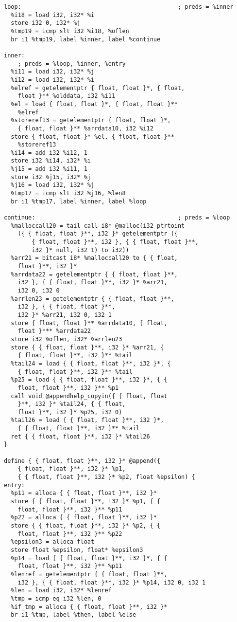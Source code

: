 \documentclass[main.tex]{subfiles}
\begin{document}
{\begin{lstlisting}
loop:                                             ; preds = %inner
  %i18 = load i32, i32* %i
  store i32 0, i32* %j
  %tmp19 = icmp slt i32 %i18, %oflen
  br i1 %tmp19, label %inner, label %continue

inner:                                            
    ; preds = %loop, %inner, %entry
  %i11 = load i32, i32* %j
  %i12 = load i32, i32* %i
  %elref = getelementptr { float, float }*, { float, 
    float }** %olddata, i32 %i11
  %el = load { float, float }*, { float, float }** 
    %elref
  %storeref13 = getelementptr { float, float }*, 
    { float, float }** %arrdata10, i32 %i12
  store { float, float }* %el, { float, float }** 
    %storeref13
  %i14 = add i32 %i12, 1
  store i32 %i14, i32* %i
  %j15 = add i32 %i11, 1
  store i32 %j15, i32* %j
  %j16 = load i32, i32* %j
  %tmp17 = icmp slt i32 %j16, %len8
  br i1 %tmp17, label %inner, label %loop

continue:                                         ; preds = %loop
  %malloccall20 = tail call i8* @malloc(i32 ptrtoint 
    ({ { float, float }**, i32 }* getelementptr ({ 
        { float, float }**, i32 }, { { float, float }**,
        i32 }* null, i32 1) to i32))
  %arr21 = bitcast i8* %malloccall20 to { { float, 
    float }**, i32 }*
  %arrdata22 = getelementptr { { float, float }**, 
    i32 }, { { float, float }**, i32 }* %arr21, 
    i32 0, i32 0
  %arrlen23 = getelementptr { { float, float }**, 
    i32 }, { { float, float }**, 
    i32 }* %arr21, i32 0, i32 1
  store { float, float }** %arrdata10, { float, 
    float }*** %arrdata22
  store i32 %oflen, i32* %arrlen23
  store { { float, float }**, i32 }* %arr21, { 
    { float, float }**, i32 }** %tail
  %tail24 = load { { float, float }**, i32 }*, {
    { float, float }**, i32 }** %tail
  %p25 = load { { float, float }**, i32 }*, { { 
    float, float }**, i32 }** %p1
  call void @appendhelp_copyin({ { float, float 
    }**, i32 }* %tail24, { { float, 
    float }**, i32 }* %p25, i32 0)
  %tail26 = load { { float, float }**, i32 }*, 
    { { float, float }**, i32 }** %tail
  ret { { float, float }**, i32 }* %tail26
}

define { { float, float }**, i32 }* @append({ 
    { float, float }**, i32 }* %p1, 
    { { float, float }**, i32 }* %p2, float %epsilon) {
entry:
  %p11 = alloca { { float, float }**, i32 }*
  store { { float, float }**, i32 }* %p1, { { 
    float, float }**, i32 }** %p11
  %p22 = alloca { { float, float }**, i32 }*
  store { { float, float }**, i32 }* %p2, { { 
    float, float }**, i32 }** %p22
  %epsilon3 = alloca float
  store float %epsilon, float* %epsilon3
  %p14 = load { { float, float }**, i32 }*, { { 
    float, float }**, i32 }** %p11
  %lenref = getelementptr { { float, float }**,
    i32 }, { { float, float }**, i32 }* %p14, i32 0, i32 1
  %len = load i32, i32* %lenref
  %tmp = icmp eq i32 %len, 0
  %if_tmp = alloca { { float, float }**, i32 }*
  br i1 %tmp, label %then, label %else


\end{lstlisting}}
\end{document}
